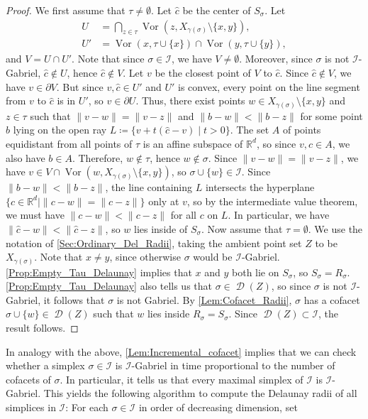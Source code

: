 \documentclass[11pt]{amsart}
\newcommand{\R}{\mathbb{R}} %
\DeclareMathOperator{\Vor}{Vor}
\DeclareMathOperator{\Del}{\mathcal{D}}
\newcommand{\Incr}[0]{\mathcal{I}}
\theoremstyle{plain}
\theoremstyle{definition}
\theoremstyle{remark}
\begin{document}
\begin{proof}
We first assume that $\tau\ne \emptyset$.  Let $\hat c$ be the center of $S_{\sigma}$.  Let 
\begin{align*}
U&=\bigcap_{z\in \tau} \Vor(z,X_{\gamma(\sigma)}\setminus \{x,y\}),\\ 
U'&=\Vor(x,\tau\cup\{x\})\cap  \Vor(y,\tau\cup\{y\}),
\end{align*}
and $V=U\cap U'$.  Note that since $\sigma\in \Incr$, we have $V\ne \emptyset$.  Moreover, since $\sigma$ is not $\Incr$-Gabriel, $\hat c\notin U$, hence $\hat c\not\in V$.     Let $v$ be the closest point of $V$ to $\hat c$. Since $\hat c \notin V$, we have $v\in \partial V$.    But since $v,\hat c\in U'$ and $U'$ is convex, every point on the line segment from $v$ to $\hat c$ is in $U'$, so $v\in \partial U$.  Thus, there exist points $w \in X_{\gamma(\sigma)}\setminus\{x,y\}$ and $z\in \tau$ such that $\|v-w\|=\|v-z\|$ and $\|b-w\|<\|b-z\|$ for some point $b$ lying on the open ray $L\coloneqq \{v+t(\hat c-v)\mid t>0\}$.  The set $A$ of points equidistant from all points of $\tau$ is an affine subspace of $\R^d$, so since $v,\hat c\in A$, we also have $b\in A$.  Therefore, $w\not\in\tau$, hence $w\not\in \sigma$.  Since $\|v-w\|=\|v-z\|$, we have $v \in V\cap \Vor(w,X_{\gamma(\sigma)}\setminus \{x,y\})$, so $\sigma \cup \{w\} \in \Incr$.  Since $\|b-w\|<\|b-z\|$, the line containing $L$ intersects the hyperplane $\{c\in \R^d \mid \|c-w\|= \|c-z\|\}$ only at $v$, so by the intermediate value theorem, we must have  $\|c-w\|<\|c-z\|$ for all $c$ on $L$.  In particular, we have  $\|\hat c-w\|<\|\hat c-z\|$, so $w$ lies inside of $S_{\sigma}$.
%
Now assume that $\tau= \emptyset$.  We use the notation of \cref{Sec:Ordinary_Del_Radii}, taking the ambient point set $Z$ to be $X_{\gamma(\sigma)}$.  Note that $x\ne y$, since otherwise $\sigma$ would be $\Incr$-Gabriel.   \cref{Prop:Empty_Tau_Delaunay} implies that $x$ and $y$ both lie on $S_\sigma$, so $S_{\sigma}=R_{\sigma}$.   \cref{Prop:Empty_Tau_Delaunay} also tells us that $\sigma\in \Del(Z)$, so since $\sigma$ is not $\Incr$-Gabriel, it follows that $\sigma$ is not Gabriel.  By \cref{Lem:Cofacet_Radii}, $\sigma$ has a cofacet $\sigma \cup \{w\} \in \Del(Z)$ such that $w$ lies inside $R_{\sigma}=S_{\sigma}$.  Since $\Del(Z)\subset \Incr$, the result follows. 
\end{proof}
%
In analogy with the above, \cref{Lem:Incremental_cofacet} implies that we can check whether a simplex $\sigma\in \Incr$ is $\Incr$-Gabriel in time proportional to the number of cofacets of $\sigma$.   In particular, it tells us that every maximal simplex of $\Incr$ is $\Incr$-Gabriel.  This yields the following algorithm to compute the Delaunay radii of all simplices in $\Incr$: For each $\sigma \in \Incr$ in order of decreasing dimension, set 
\end{document}
